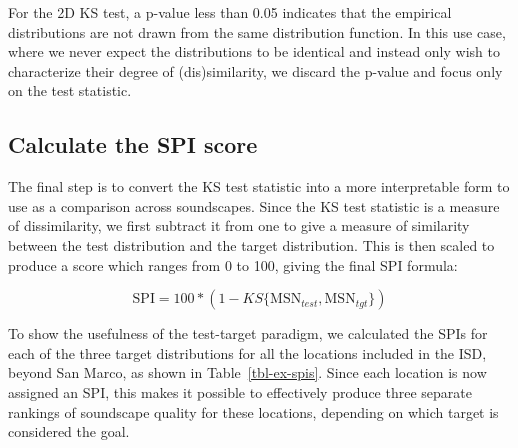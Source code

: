 \documentclass[
  authoryear,
  preprint,
  3p]{elsarticle}
\begin{document}
For the 2D KS test, a p-value less than 0.05 indicates that the
empirical distributions are not drawn from the same distribution
function. In this use case, where we never expect the distributions to
be identical and instead only wish to characterize their degree of
(dis)similarity, we discard the p-value and focus only on the test
statistic.

\subsection{Calculate the SPI score}\label{calculate-the-spi-score}

The final step is to convert the KS test statistic into a more
interpretable form to use as a comparison across soundscapes. Since the
KS test statistic is a measure of dissimilarity, we first subtract it
from one to give a measure of similarity between the test distribution
and the target distribution. This is then scaled to produce a score
which ranges from 0 to 100, giving the final SPI formula:

\[
\text{SPI} = 100 * (1 - KS\{\text{MSN}_{test}, \text{MSN}_{tgt}\})
\]

To show the usefulness of the test-target paradigm, we calculated the
SPIs for each of the three target distributions for all the locations
included in the ISD, beyond San Marco, as shown in
Table~\ref{tbl-ex-spis}. Since each location is now assigned an SPI,
this makes it possible to effectively produce three separate rankings of
soundscape quality for these locations, depending on which target is
considered the goal.
\end{document}
